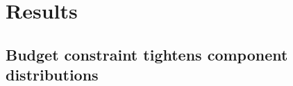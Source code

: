 \documentclass[11pt]{article}
\begin{document}
%
%
%
%
%
%


\section{Results}
\label{sec:results}

\subsection{Budget constraint tightens component distributions}
%
%
%
\end{document}
